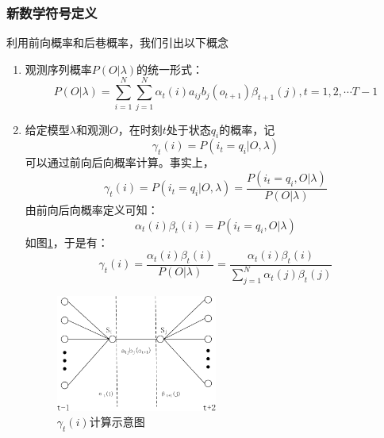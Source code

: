         \subsubsection{新数学符号定义}
        利用前向概率和后巷概率，我们引出以下概念
        \begin{enumerate}
            \item 观测序列概率$P(O|\lambda )$的统一形式：
                \begin{equation}
                    P(O|\lambda ) = \sum\limits_{i = 1}^N {\sum\limits_{j = 1}^N {{\alpha _t}(i)} {a_{ij}}{b_j}({o_{t + 1}}){\beta _{t + 1}}\left( j \right),} t = 1,2, \cdots T - 1
                \end{equation}
            \item 给定模型$\lambda $和观测$O$，在时刻$t$处于状态$q_i$的概率，记
                \begin{equation}
                    {\gamma _t}(i) = P({i_t} = {q_i}|O,\lambda )
                \end{equation}
                可以通过前向后向概率计算。事实上，
                \[{\gamma _t}(i) = P({i_t} = {q_i}|O,\lambda ) = \frac{{P({i_t} = {q_i},O|\lambda )}}{{P(O|\lambda )}}\]
                由前向后向概率定义可知：
                \[{\alpha _t}(i){\beta _t}(i) = P({i_t} = {q_i},O|\lambda )\]
                如图\ref{fig:gamma}，于是有：
                \begin{equation}\label{equation:gamma}
                {\gamma _t}(i) = \frac{{{\alpha _t}(i){\beta _t}(i)}}{{P(O|\lambda )}} = \frac{{{\alpha _t}(i){\beta _t}(i)}}{{\sum\limits_{j = 1}^N {{\alpha _t}(j){\beta _t}(j)} }}
                \end{equation}

                \begin{figure}[htbp]
                \centering
                \includegraphics[width=0.5\textwidth]{figures/chapter2/gamma-crop}
                \caption{${\gamma _t}(i)$计算示意图}
                \label{fig:gamma}
                \end{figure}


\end{enumerate}
